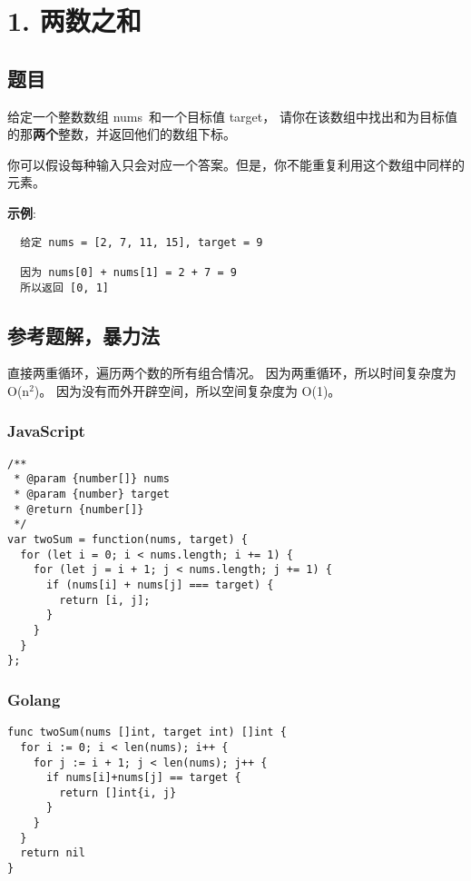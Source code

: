 \newpage
\section{1. 两数之和}
\label{leetcode:1}

\subsection{题目}

给定一个整数数组 nums 和一个目标值 target，
请你在该数组中找出和为目标值的那\textbf{两个}整数，并返回他们的数组下标。

你可以假设每种输入只会对应一个答案。但是，你不能重复利用这个数组中同样的元素。

\textbf{示例}:

\begin{verbatim}
  给定 nums = [2, 7, 11, 15], target = 9

  因为 nums[0] + nums[1] = 2 + 7 = 9
  所以返回 [0, 1]
\end{verbatim}

\subsection{参考题解，暴力法}

直接两重循环，遍历两个数的所有组合情况。
因为两重循环，所以时间复杂度为 O(n$^{2}$)。
因为没有而外开辟空间，所以空间复杂度为 O(1)。

\subsubsection{JavaScript}

\begin{verbatim}
/**
 * @param {number[]} nums
 * @param {number} target
 * @return {number[]}
 */
var twoSum = function(nums, target) {
  for (let i = 0; i < nums.length; i += 1) {
    for (let j = i + 1; j < nums.length; j += 1) {
      if (nums[i] + nums[j] === target) {
        return [i, j];
      }
    }
  }
};
\end{verbatim}

\subsubsection{Golang}

\begin{verbatim}
func twoSum(nums []int, target int) []int {
  for i := 0; i < len(nums); i++ {
    for j := i + 1; j < len(nums); j++ {
      if nums[i]+nums[j] == target {
        return []int{i, j}
      }
    }
  }
  return nil
}
\end{verbatim}

